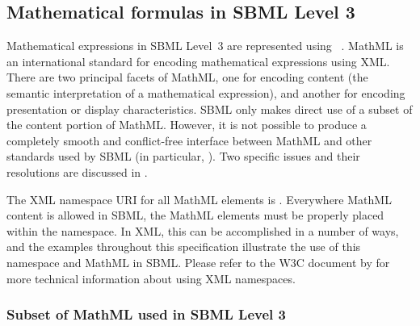 \subsection{Mathematical formulas in SBML Level 3}
\label{sec:formulas}

Mathematical expressions in SBML Level~3 are represented using
\mathmltwo~\citep{w3c:2000b}.  MathML is an international standard
for encoding mathematical expressions using XML.  There are two
principal facets of MathML, one for encoding content (\ie the
semantic interpretation of a mathematical expression), and another
for encoding presentation or display characteristics.  SBML only
makes direct use of a subset of the content portion of MathML.
However, it is not possible to produce a completely smooth and
conflict-free interface between MathML and other standards used by
SBML (in particular, \xmlschema).  Two specific issues and their
resolutions are discussed in .

The XML namespace URI for all MathML elements is
.  Everywhere MathML
content is allowed in SBML, the MathML elements must be properly
placed within the \mathmltwo namespace.  In XML, this can be
accomplished in a number of ways, and the examples throughout this
specification illustrate the use of this namespace and MathML in
SBML.  Please refer to the W3C document by \citet{bray:1999} for
more technical information about using XML namespaces.


\subsubsection{Subset of MathML used in SBML Level 3 }
\label{sec:mathmlsubset}

